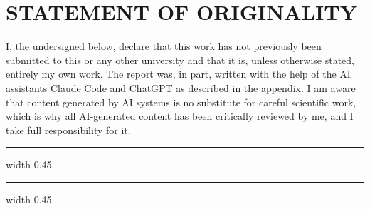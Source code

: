 \documentclass[../report.tex]{subfiles}
\begin{document}
    \section*{STATEMENT OF ORIGINALITY}

    \noindent I, the undersigned below, declare that this work has not previously been submitted to this or any other university and that it is, unless otherwise stated, entirely my own work. The report was, in part, written with the help of the AI assistants Claude Code and ChatGPT as described in the appendix. I am aware that content generated by AI systems is no substitute for careful scientific work, which is why all AI-generated content has been critically reviewed by me, and I take full responsibility for it.

    \vspace{1cm}

    \hrule width 0.45\linewidth
    \hfill \hspace{0.025\linewidth}
    \hrulefill


    \vspace{1cm}

    \hrule width 0.45\linewidth
    \hfill \hspace{0.025\linewidth}
    \hrulefill

\end{document}
